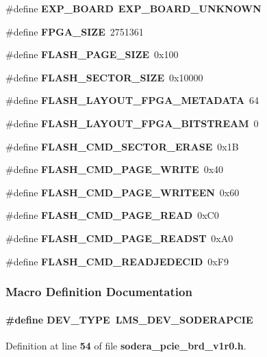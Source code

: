 \begin{DoxyCompactItemize}
\#define {\bf E\+X\+P\+\_\+\+B\+O\+A\+RD}~{\bf E\+X\+P\+\_\+\+B\+O\+A\+R\+D\+\_\+\+U\+N\+K\+N\+O\+WN}
\item 
\#define {\bf F\+P\+G\+A\+\_\+\+S\+I\+ZE}~2751361
\item 
\#define {\bf F\+L\+A\+S\+H\+\_\+\+P\+A\+G\+E\+\_\+\+S\+I\+ZE}~0x100
\item 
\#define {\bf F\+L\+A\+S\+H\+\_\+\+S\+E\+C\+T\+O\+R\+\_\+\+S\+I\+ZE}~0x10000
\item 
\#define {\bf F\+L\+A\+S\+H\+\_\+\+L\+A\+Y\+O\+U\+T\+\_\+\+F\+P\+G\+A\+\_\+\+M\+E\+T\+A\+D\+A\+TA}~64
\item 
\#define {\bf F\+L\+A\+S\+H\+\_\+\+L\+A\+Y\+O\+U\+T\+\_\+\+F\+P\+G\+A\+\_\+\+B\+I\+T\+S\+T\+R\+E\+AM}~0
\item 
\#define {\bf F\+L\+A\+S\+H\+\_\+\+C\+M\+D\+\_\+\+S\+E\+C\+T\+O\+R\+\_\+\+E\+R\+A\+SE}~0x1B
\item 
\#define {\bf F\+L\+A\+S\+H\+\_\+\+C\+M\+D\+\_\+\+P\+A\+G\+E\+\_\+\+W\+R\+I\+TE}~0x40
\item 
\#define {\bf F\+L\+A\+S\+H\+\_\+\+C\+M\+D\+\_\+\+P\+A\+G\+E\+\_\+\+W\+R\+I\+T\+E\+EN}~0x60
\item 
\#define {\bf F\+L\+A\+S\+H\+\_\+\+C\+M\+D\+\_\+\+P\+A\+G\+E\+\_\+\+R\+E\+AD}~0x\+C0
\item 
\#define {\bf F\+L\+A\+S\+H\+\_\+\+C\+M\+D\+\_\+\+P\+A\+G\+E\+\_\+\+R\+E\+A\+D\+ST}~0x\+A0
\item 
\#define {\bf F\+L\+A\+S\+H\+\_\+\+C\+M\+D\+\_\+\+R\+E\+A\+D\+J\+E\+D\+E\+C\+ID}~0x\+F9
\end{DoxyCompactItemize}


\subsubsection{Macro Definition Documentation}
\paragraph[{D\+E\+V\+\_\+\+T\+Y\+PE}]{\setlength{\rightskip}{0pt plus 5cm}\#define D\+E\+V\+\_\+\+T\+Y\+PE~{\bf L\+M\+S\+\_\+\+D\+E\+V\+\_\+\+S\+O\+D\+E\+R\+A\+P\+C\+IE}}\label{sodera__pcie__brd__v1r0_8h_a5454b7a913f969a1aa7eacaf500fb44e}


Definition at line {\bf 54} of file {\bf sodera\+\_\+pcie\+\_\+brd\+\_\+v1r0.\+h}.




